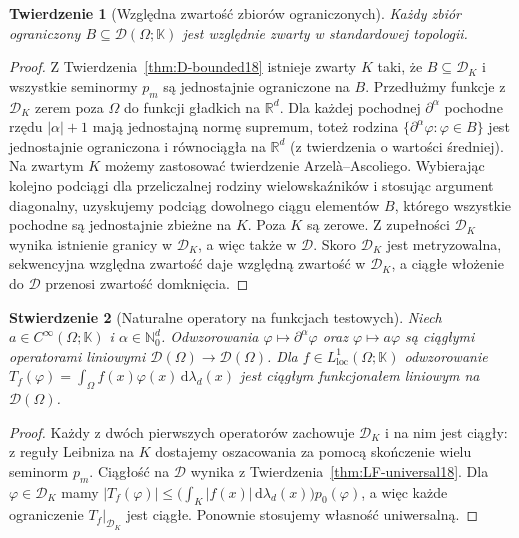 \documentclass[11pt,a4paper]{article}
\numberwithin{equation}{section}
\theoremstyle{plain}
\newtheorem{twierdzenie}{Twierdzenie}[section]
\newtheorem{stwierdzenie}[twierdzenie]{Stwierdzenie}
\theoremstyle{definition}
\theoremstyle{remark}
\newcommand{\R}{\mathbb R}
\newcommand{\N}{\mathbb N}
\newcommand{\K}{\mathbb K}
\begin{document}
\begin{twierdzenie}[Względna zwartość zbiorów ograniczonych]
\label{thm:D-Montel18}
Każdy zbiór ograniczony $B\subseteq\mathcal D(\Omega;\K)$
jest względnie zwarty w standardowej topologii.
\end{twierdzenie}
\begin{proof}
Z Twierdzenia~\ref{thm:D-bounded18} istnieje zwarty $K$
taki, że $B\subseteq\mathcal D_K$ i wszystkie seminormy
$p_m$ są jednostajnie ograniczone na $B$.
Przedłużmy funkcje z $\mathcal D_K$ zerem poza $\Omega$
do funkcji gładkich na $\R^d$. Dla każdej pochodnej
$\partial^\alpha$ pochodne rzędu $|\alpha|+1$ mają
jednostajną normę supremum, toteż rodzina
$\{\partial^\alpha\varphi:\varphi\in B\}$ jest
jednostajnie ograniczona i równociągła na $\R^d$
(z twierdzenia o wartości średniej). Na zwartym $K$
możemy zastosować twierdzenie Arzel\`a--Ascoliego.
Wybierając kolejno podciągi dla przeliczalnej rodziny
wielowskaźników i stosując argument diagonalny,
uzyskujemy podciąg dowolnego ciągu elementów $B$,
którego wszystkie pochodne są jednostajnie zbieżne na $K$.
Poza $K$ są zerowe. Z zupełności $\mathcal D_K$
wynika istnienie granicy w $\mathcal D_K$, a więc także
w $\mathcal D$. Skoro $\mathcal D_K$ jest metryzowalna,
sekwencyjna względna zwartość daje względną zwartość
w $\mathcal D_K$, a ciągłe włożenie do $\mathcal D$
przenosi zwartość domknięcia.
\end{proof}

\begin{stwierdzenie}[Naturalne operatory na funkcjach testowych]
\label{prop:D-operators18}
Niech $a\in C^\infty(\Omega;\K)$ i
$\alpha\in\N_0^d$. Odwzorowania
$\varphi\mapsto\partial^\alpha\varphi$ oraz
$\varphi\mapsto a\varphi$ są ciągłymi operatorami
liniowymi $\mathcal D(\Omega)\to\mathcal D(\Omega)$.
Dla $f\in L^1_{\mathrm{loc}}(\Omega;\K)$ odwzorowanie
$T_f(\varphi)=\int_\Omega f(x)\varphi(x)\,\mathrm d\lambda_d(x)$
jest ciągłym funkcjonałem liniowym na $\mathcal D(\Omega)$.
\end{stwierdzenie}
\begin{proof}
Każdy z dwóch pierwszych operatorów zachowuje
$\mathcal D_K$ i na nim jest ciągły: z reguły Leibniza
na $K$ dostajemy oszacowania za pomocą skończenie
wielu seminorm $p_m$. Ciągłość na $\mathcal D$ wynika
z Twierdzenia~\ref{thm:LF-universal18}.
Dla $\varphi\in\mathcal D_K$ mamy
$|T_f(\varphi)|\le
\bigl(\int_K|f(x)|\,\mathrm d\lambda_d(x)\bigr)p_0(\varphi)$,
a więc każde ograniczenie $T_f|_{\mathcal D_K}$
jest ciągłe. Ponownie stosujemy własność uniwersalną.
\end{proof}
\end{document}

